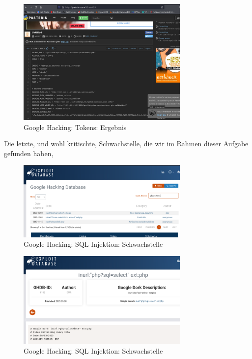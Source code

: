 \documentclass{article}
\begin{document}
\begin{figure}[H]
	\includegraphics[width=0.75\textwidth]{images/19}
	\centering
	\caption{Google Hacking: Tokens: Ergebnis}
\end{figure}

Die letzte, und wohl kritischte, Schwachstelle, die wir im Rahmen dieser Aufgabe gefunden 
haben,


\begin{figure}[H]
	\includegraphics[width=0.75\textwidth]{images/20}
	\centering
	\caption{Google Hacking: SQL Injektion: Schwachstelle}
\end{figure}

\begin{figure}[H]
	\includegraphics[width=0.75\textwidth]{images/21}
	\centering
	\caption{Google Hacking: SQL Injektion: Schwachstelle}
\end{figure}
\end{document}
